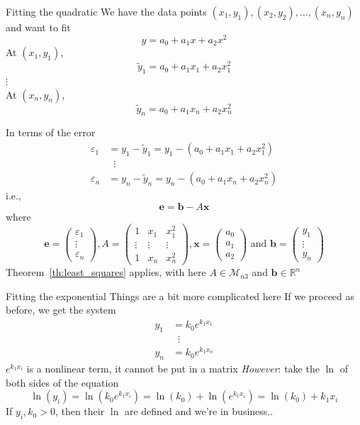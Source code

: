 \documentclass{beamer}
\def\IR{\mathbb{R}}
\def\M{\mathcal{M}}
\def\bb{\mathbf{b}}
\def\be{\mathbf{e}}
\def\bx{\mathbf{x}}
\begin{document}
\begin{frame}{Fitting the quadratic}
We have the data points $(x_1,y_1),(x_2,y_2),\ldots,(x_n,y_n)$ and want to fit
\[
y = a_0+a_1x+a_2x^2
\]
At $(x_1,y_1)$,
\[
\tilde y_1 = a_0+a_1x_1+a_2x_1^2
\]
$\vdots$\\
At $(x_n,y_n)$,
\[
\tilde y_n = a_0+a_1x_n+a_2x_n^2
\]
\end{frame}

\begin{frame}
In terms of the error
\begin{align*}
\varepsilon_1 &= y_1-\tilde y_1 = y_1-(a_0+a_1x_1+a_2x_1^2) \\
&\;\;\vdots\\
\varepsilon_n &= y_n-\tilde y_n = y_n-(a_0+a_1x_n+a_2x_n^2)
\end{align*}
i.e.,
\[
\be = \bb-A\bx 
\]
where
\[
\be = \begin{pmatrix}
\varepsilon_1\\ \vdots\\ \varepsilon_n
\end{pmatrix},
A=\begin{pmatrix}
1 & x_1 & x_1^2\\ \vdots & \vdots & \vdots \\ 1 & x_n & x_n^2
\end{pmatrix},
\bx = \begin{pmatrix}
a_0\\a_1\\a_2
\end{pmatrix}\textrm{ and }
\bb = \begin{pmatrix}
y_1\\ \vdots\\ y_n
\end{pmatrix}
\]
\vfill
Theorem~\ref{th:least_squares} applies, with here $A\in\M_{n3}$ and $\bb\in\IR^n$
\end{frame}


\begin{frame}{Fitting the exponential}
Things are a bit more complicated here
\vfill
If we proceed as before, we get the system
\begin{align*}
y_1 &= k_0 e^{k_1x_1} \\
&\;\;\vdots \\
y_n &= k_0 e^{k_1x_n}
\end{align*}
$e^{k_1x_i}$ is a nonlinear term, it cannot be put in a matrix
\vfill
\emph{However}: take the $\ln$ of both sides of the equation
\[
\ln(y_i) = \ln(k_0e^{k_1x_i}) = \ln(k_0)+\ln(e^{k_1x_i}) = \ln(k_0)+k_1x_i
\]
If $y_i,k_0>0$, then their $\ln$ are defined and we're in business..
\end{frame}
\end{document}
